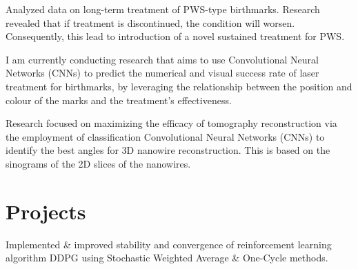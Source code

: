 \documentclass[]{CV}
\begin{document}
\begin{minipage}[t]{0.705\textwidth}
\begin{tightemize}
\quad
\end{tightemize}

\vspace{\topsep}
\begin{tightemize}

\item Analyzed data on long-term treatment of PWS-type birthmarks.  Research revealed that if treatment is discontinued, the condition will worsen. Consequently, this lead to introduction of a novel sustained treatment for PWS.

\item I am currently conducting research that aims to use Convolutional Neural Networks (CNNs) to predict the numerical and visual success rate of laser treatment for birthmarks, by leveraging the relationship between the position and colour of the marks and the treatment's effectiveness.


\end{tightemize}
\sectionsep

\vspace{\topsep} %
\begin{tightemize}
\item Research focused on maximizing the efficacy of tomography reconstruction via the employment of classification Convolutional Neural Networks (CNNs) to identify the best angles for 3D nanowire reconstruction. This is based on the sinograms of the 2D slices of the nanowires.


\end{tightemize}



\section{Projects}
\begin{tightemize}

\item Implemented \& improved stability and convergence of reinforcement learning algorithm DDPG using Stochastic Weighted Average \& One-Cycle methods.


\end{tightemize}
\end{minipage}
\end{document}
